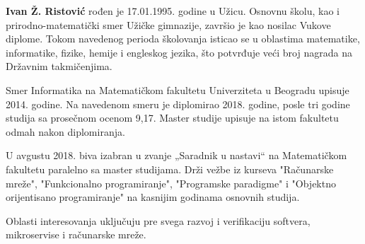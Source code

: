 \documentclass[12pt,oneside]{memoir}
\begin{document}
\frontmatter
\naslovna
\komisija
\apstrakt
\tableofcontents*

\mainmatter





\literatura

\backmatter

\begin{biografija}
  \textbf{Ivan Ž. Ristović} rođen je 17.01.1995. godine u Užicu. Osnovnu školu, kao i 
  prirodno-matematički smer Užičke gimnazije, završio je kao nosilac Vukove diplome. 
  Tokom navedenog perioda školovanja isticao se u oblastima matematike, informatike, 
  fizike, hemije i engleskog jezika, što potvrđuje veći broj nagrada na Državnim 
  takmičenjima.

  Smer Informatika na Matematičkom fakultetu Univerziteta u Beogradu upisuje 2014. 
  godine. Na navedenom smeru je diplomirao 2018. godine, posle tri godine studija 
  sa prosečnom ocenom 9,17. Master studije upisuje na istom fakultetu odmah nakon 
  diplomiranja.
  
  U avgustu 2018. biva izabran u zvanje „Saradnik u nastavi“ na Matematičkom 
  fakultetu paralelno sa master studijama. Drži vežbe iz kurseva "Računarske mreže",
  "Funkcionalno programiranje", "Programske paradigme" i "Objektno orijentisano 
  programiranje" na kasnijim godinama osnovnih studija.
  
  Oblasti interesovanja uključuju pre svega razvoj i verifikaciju softvera, mikroservise 
  i računarske mreže.
\end{biografija}
\end{document}
